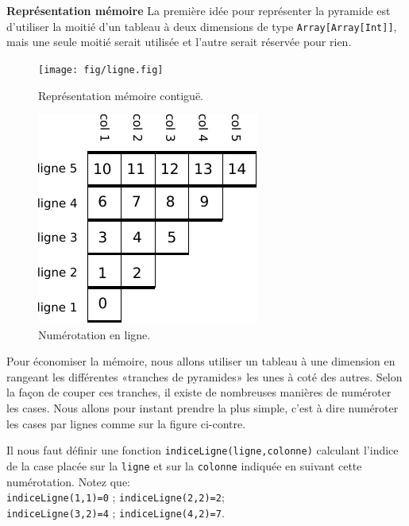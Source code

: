 \documentclass[10pt]{article}\usepackage[nu]{esial}
\begin{document}
\begin{Exercice}\textbf{Représentation mémoire}
  \noindent La première idée pour représenter la pyramide est d'utiliser la
  moitié d'un tableau à deux dimensions de type \texttt{Array[Array[Int]]}, mais
  une seule moitié serait utilisée et l'autre serait réservée pour rien.
\end{Exercice}

\begin{figure}[h]
  \centering
  \texttt{[image: fig/ligne.fig]}\vspace{-.5\baselineskip}
  \caption{Représentation mémoire contiguë.}
  \label{fig:mem}%
\end{figure}

\begin{figure}
  \vspace{-1.2\baselineskip}
  \centerline{\includegraphics[scale=.9]{img/numerotation-ligne.pdf}}
  \vspace{-.5\baselineskip}
  \caption{Numérotation en ligne.}
  \label{fig:numligne}
  \vspace{-1.5\baselineskip}
  
\end{figure}

Pour économiser la mémoire, nous allons utiliser un tableau à une dimension en
rangeant les différentes «tranches de pyramides» les unes à coté des
autres. Selon la façon de couper ces tranches, il existe de nombreuses manières
de numéroter les cases. Nous allons pour instant prendre la plus simple, c'est à
dire numéroter les cases par lignes comme sur la figure ci-contre.

Il nous faut définir une fonction \texttt{indiceLigne(ligne,colonne)} calculant
l'indice de la case placée sur la \texttt{ligne} et sur la \texttt{colonne}
indiquée en suivant cette numérotation. Notez que:\\
\texttt{indiceLigne(1,1)=0} ; \texttt{indiceLigne(2,2)=2};\\
\texttt{indiceLigne(3,2)=4} ; \texttt{indiceLigne(4,2)=7}. 
\end{document}
